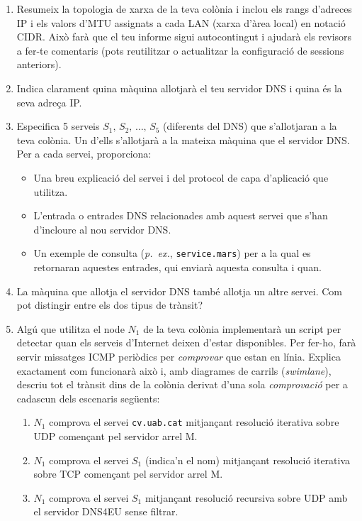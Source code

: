 \begin{enumerate}[itemsep=0.1cm]
\item Resumeix la topologia de xarxa de la teva colònia i inclou els rangs d'adreces IP i els valors d'MTU assignats a cada LAN (xarxa d'àrea local) en notació CIDR. Això farà que el teu informe sigui autocontingut i ajudarà els revisors a fer-te comentaris (pots reutilitzar o actualitzar la configuració de sessions anteriors).

\item Indica clarament quina màquina allotjarà el teu servidor DNS i quina és la seva adreça IP.

\item Especifica 5 serveis $S_1,\,S_2,\,\ldots,\,S_5$ (diferents del DNS) que s'allotjaran a la teva colònia. Un d'ells s'allotjarà a la mateixa màquina que el servidor DNS. Per a cada servei, proporciona:
    \begin{itemize}[itemsep=0.1cm]
    \item Una breu explicació del servei i del protocol de capa d'aplicació que utilitza.
    \item L'entrada o entrades DNS relacionades amb aquest servei que s'han d'incloure al nou servidor DNS.
    \item Un exemple de consulta (\textit{p.\ ex.}, \texttt{service.mars}) per a la qual es retornaran aquestes entrades, qui enviarà aquesta consulta i quan.
    \end{itemize}

\item La màquina que allotja el servidor DNS també allotja un altre servei. Com pot distingir entre els dos tipus de trànsit?

\item Algú que utilitza el node $N_1$ de la teva colònia implementarà un script per detectar quan els serveis d'Internet deixen d'estar disponibles. Per fer-ho, farà servir missatges ICMP periòdics per \textit{comprovar} que estan en línia. Explica exactament com funcionarà això i, amb diagrames de carrils (\textit{swimlane}), descriu tot el trànsit dins de la colònia derivat d'una sola \textit{comprovació} per a cadascun dels escenaris següents:
    \begin{enumerate}[itemsep=0.1cm]
    \item $N_1$ comprova el servei \texttt{cv.uab.cat} mitjançant resolució iterativa sobre UDP començant pel servidor arrel M.
    \item $N_1$ comprova el servei $S_1$ (indica'n el nom) mitjançant resolució iterativa sobre TCP començant pel servidor arrel M.
    \item $N_1$ comprova el servei $S_1$ mitjançant resolució recursiva sobre UDP amb el servidor DNS4EU sense filtrar.
    \end{enumerate}


\end{enumerate}

